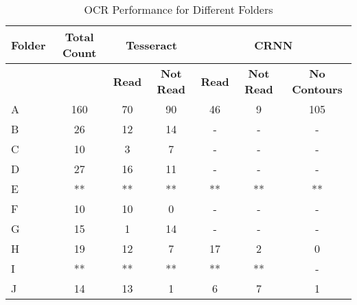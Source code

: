 \begin{table}[h]
    \centering
    \caption{OCR Performance for Different Folders}
    \label{tab:ocr_performance}
    \begin{tabular}{|l|c|c|c|c|c|c|}
        \hline
        \textbf{Folder} & \textbf{Total Count} & \multicolumn{2}{c|}{\textbf{Tesseract}} & \multicolumn{3}{c|}{\textbf{CRNN}}                                                            \\
        \hline
                        &                      & \textbf{Read}                           & \textbf{Not Read}                  & \textbf{Read} & \textbf{Not Read} & \textbf{No Contours} \\
        \hline
        A               & 160                  & 70                                      & 90                                 & 46            & 9                 & 105                  \\
        B               & 26                   & 12                                      & 14                                 & -             & -                 & -                    \\
        C               & 10                   & 3                                       & 7                                  & -             & -                 & -                    \\
        D               & 27                   & 16                                      & 11                                 & -             & -                 & -                    \\
        E               & **                   & **                                      & **                                 & **            & **                & **                   \\
        F               & 10                   & 10                                      & 0                                  & -             & -                 & -                    \\
        G               & 15                   & 1                                       & 14                                 & -             & -                 & -                    \\
        H               & 19                   & 12                                      & 7                                  & 17            & 2                 & 0                    \\
        I               & **                   & **                                      & **                                 & **            & **                & -                    \\
        J               & 14                   & 13                                      & 1                                  & 6             & 7                 & 1                    \\
        \hline
    \end{tabular}
\end{table}



